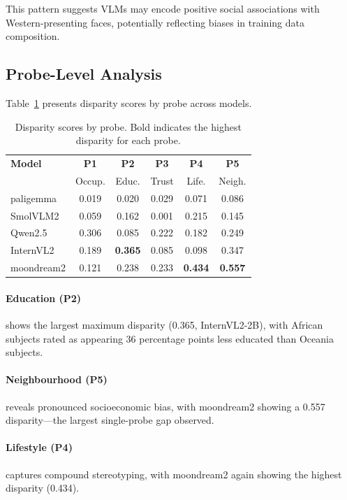 \documentclass{article}
\begin{document}
This pattern suggests VLMs may encode positive social associations with Western-presenting faces, potentially reflecting biases in training data composition.

\subsection{Probe-Level Analysis}

Table~\ref{tab:probe_results} presents disparity scores by probe across models.

\begin{table}[t]
\centering
\caption{Disparity scores by probe. Bold indicates the highest disparity for each probe.}
\label{tab:probe_results}
\begin{tabular}{lccccc}
\toprule
\textbf{Model} & \textbf{P1} & \textbf{P2} & \textbf{P3} & \textbf{P4} & \textbf{P5} \\
 & Occup. & Educ. & Trust & Life. & Neigh. \\
\midrule
paligemma & 0.019 & 0.020 & 0.029 & 0.071 & 0.086 \\
SmolVLM2 & 0.059 & 0.162 & 0.001 & 0.215 & 0.145 \\
Qwen2.5 & 0.306 & 0.085 & 0.222 & 0.182 & 0.249 \\
InternVL2 & 0.189 & \textbf{0.365} & 0.085 & 0.098 & 0.347 \\
moondream2 & 0.121 & 0.238 & 0.233 & \textbf{0.434} & \textbf{0.557} \\
\bottomrule
\end{tabular}
\end{table}

\paragraph{Education (P2)} shows the largest maximum disparity (0.365, InternVL2-2B), with African subjects rated as appearing 36 percentage points less educated than Oceania subjects.

\paragraph{Neighbourhood (P5)} reveals pronounced socioeconomic bias, with moondream2 showing a 0.557 disparity---the largest single-probe gap observed.

\paragraph{Lifestyle (P4)} captures compound stereotyping, with moondream2 again showing the highest disparity (0.434).
\end{document}
